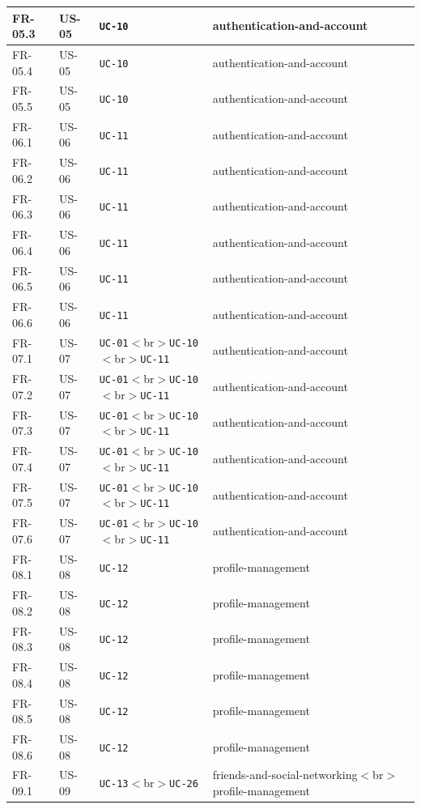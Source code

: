 \documentclass[12pt]{article}
\begin{document}
\begin{longtable}{|>{\raggedright\arraybackslash}p{}|>{\raggedright\arraybackslash}p{}|>{\raggedright\arraybackslash}p{}|>{\raggedright\arraybackslash}p{}|}
FR-05.3 & US-05 & \texttt{UC-10} & authentication-and-account \\ \hline
FR-05.4 & US-05 & \texttt{UC-10} & authentication-and-account \\ \hline
FR-05.5 & US-05 & \texttt{UC-10} & authentication-and-account \\ \hline
FR-06.1 & US-06 & \texttt{UC-11} & authentication-and-account \\ \hline
FR-06.2 & US-06 & \texttt{UC-11} & authentication-and-account \\ \hline
FR-06.3 & US-06 & \texttt{UC-11} & authentication-and-account \\ \hline
FR-06.4 & US-06 & \texttt{UC-11} & authentication-and-account \\ \hline
FR-06.5 & US-06 & \texttt{UC-11} & authentication-and-account \\ \hline
FR-06.6 & US-06 & \texttt{UC-11} & authentication-and-account \\ \hline
FR-07.1 & US-07 & \texttt{UC-01}$<$br$>$\texttt{UC-10}$<$br$>$\texttt{UC-11} & authentication-and-account \\ \hline
FR-07.2 & US-07 & \texttt{UC-01}$<$br$>$\texttt{UC-10}$<$br$>$\texttt{UC-11} & authentication-and-account \\ \hline
FR-07.3 & US-07 & \texttt{UC-01}$<$br$>$\texttt{UC-10}$<$br$>$\texttt{UC-11} & authentication-and-account \\ \hline
FR-07.4 & US-07 & \texttt{UC-01}$<$br$>$\texttt{UC-10}$<$br$>$\texttt{UC-11} & authentication-and-account \\ \hline
FR-07.5 & US-07 & \texttt{UC-01}$<$br$>$\texttt{UC-10}$<$br$>$\texttt{UC-11} & authentication-and-account \\ \hline
FR-07.6 & US-07 & \texttt{UC-01}$<$br$>$\texttt{UC-10}$<$br$>$\texttt{UC-11} & authentication-and-account \\ \hline
FR-08.1 & US-08 & \texttt{UC-12} & profile-management \\ \hline
FR-08.2 & US-08 & \texttt{UC-12} & profile-management \\ \hline
FR-08.3 & US-08 & \texttt{UC-12} & profile-management \\ \hline
FR-08.4 & US-08 & \texttt{UC-12} & profile-management \\ \hline
FR-08.5 & US-08 & \texttt{UC-12} & profile-management \\ \hline
FR-08.6 & US-08 & \texttt{UC-12} & profile-management \\ \hline
FR-09.1 & US-09 & \texttt{UC-13}$<$br$>$\texttt{UC-26} & friends-and-social-networking$<$br$>$profile-management \\ \hline

\end{longtable}
\end{document}
